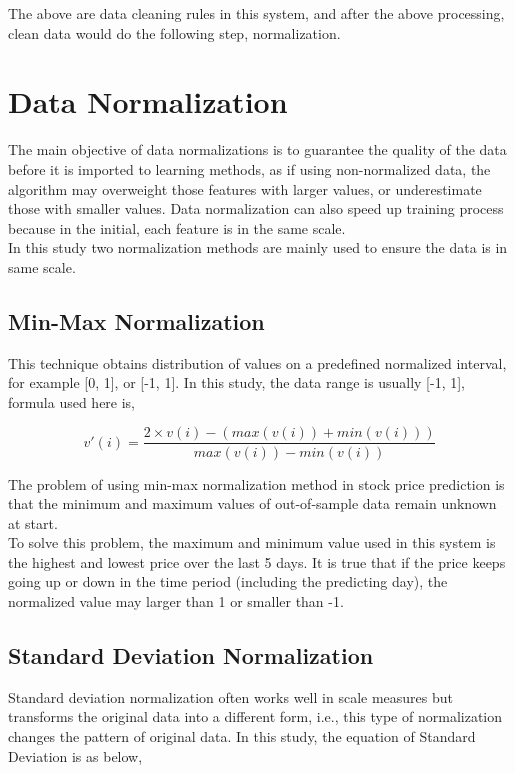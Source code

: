 The above are data cleaning rules in this system, and after the above processing, clean data would do the following step, normalization.


\section{Data Normalization}

The main objective of data normalizations is to guarantee the quality of the data before it is imported to learning methods, as if using non-normalized data, the algorithm may overweight those features with larger values, or underestimate those with smaller values. Data normalization can also speed up training process because in the initial, each feature is in the same scale.\\



In this study two normalization methods are mainly used to ensure the data is in same scale.

\subsection{Min-Max Normalization\cite{4_kantardzic}}
This technique obtains distribution of values on a predefined normalized interval, for example [0, 1], or [-1, 1]. In this study, the data range is usually [-1, 1], formula used here is,



\begin{equation}
v'(i)=\frac{2\times v(i)- (max(v(i))+min(v(i)))}{max(v(i))-min(v(i))}
\end{equation}

The problem of using min-max normalization method in stock price prediction is that the minimum and maximum values of out-of-sample data remain unknown at start. \\


To solve this problem, the maximum and minimum value used in this system is the highest and lowest price over the last 5 days. It is true that if the price keeps going up or down in the time period (including the predicting day), the normalized value may larger than 1 or smaller than -1.


\subsection{Standard Deviation Normalization\cite{4_kantardzic}}


Standard deviation normalization often works well in scale measures but transforms the original data into a different form, i.e., this type of normalization changes the pattern of original data. In this study, the equation of Standard Deviation is as below,



